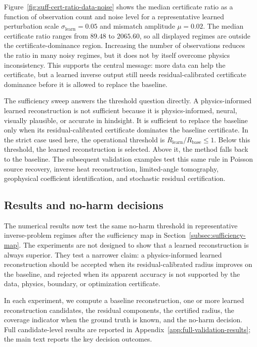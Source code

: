 \documentclass{article}
\numberwithin{equation}{section}
\theoremstyle{definition}
\begin{document}
Figure~\ref{fig:suff-cert-ratio-data-noise} shows the median certificate ratio as a function of observation count and noise level for a representative learned perturbation scale \(\sigma_{\mathrm{learn}}=0.05\) and mismatch amplitude \(\mu=0.02\). The median certificate ratio ranges from \(89.48\) to \(2065.60\), so all displayed regimes are outside the certificate-dominance region. Increasing the number of observations reduces the ratio in many noisy regimes, but it does not by itself overcome physics inconsistency. This supports the central message: more data can help the certificate, but a learned inverse output still needs residual-calibrated certificate dominance before it is allowed to replace the baseline.

The sufficiency sweep answers the threshold question directly. A physics-informed learned reconstruction is not sufficient because it is physics-informed, neural, visually plausible, or accurate in hindsight. It is sufficient to replace the baseline only when its residual-calibrated certificate dominates the baseline certificate. In the strict case used here, the operational threshold is \(R_{\mathrm{learn}}/R_{\mathrm{base}}\le1\). Below this threshold, the learned reconstruction is selected. Above it, the method falls back to the baseline. The subsequent validation examples test this same rule in Poisson source recovery, inverse heat reconstruction, limited-angle tomography, geophysical coefficient identification, and stochastic residual certification.

\subsection{Results and no-harm decisions}
\label{subsec:results-noharm-decisions}

The numerical results now test the same no-harm threshold in representative inverse-problem regimes after the sufficiency map in Section~\ref{subsec:sufficiency-map}. The experiments are not designed to show that a learned reconstruction is always superior. They test a narrower claim: a physics-informed learned reconstruction should be accepted when its residual-calibrated radius improves on the baseline, and rejected when its apparent accuracy is not supported by the data, physics, boundary, or optimization certificate.

In each experiment, we compute a baseline reconstruction, one or more learned reconstruction candidates, the residual components, the certified radius, the coverage indicator when the ground truth is known, and the no-harm decision. Full candidate-level results are reported in Appendix~\ref{app:full-validation-results}; the main text reports the key decision outcomes.
\end{document}

